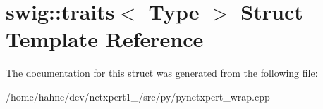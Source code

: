 \hypertarget{structswig_1_1traits}{}\section{swig\+:\+:traits$<$ Type $>$ Struct Template Reference}
\label{structswig_1_1traits}


The documentation for this struct was generated from the following file\+:\begin{DoxyCompactItemize}
\item 
/home/hahne/dev/netxpert1\+\_/src/py/pynetxpert\+\_\+wrap.\+cpp\end{DoxyCompactItemize}
